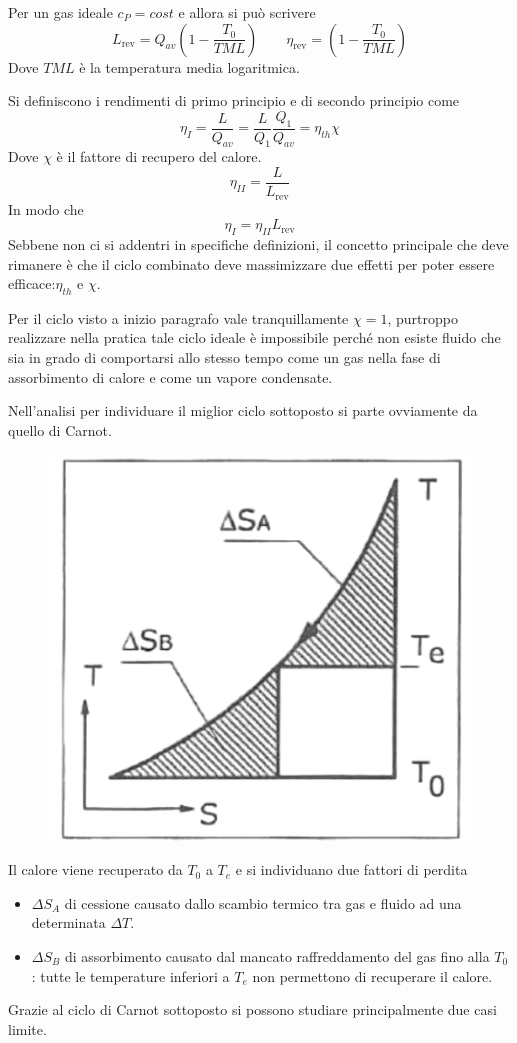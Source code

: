 \begin{adjustwidth}{2in}{}
	Per un gas ideale $c_P=cost$ e allora si può scrivere 
	\[L_\text{rev} = Q_{av}\left(1-\dfrac{T_0}{TML}\right) \qquad \eta_\text{rev} = \left(1-\dfrac{T_0}{TML}\right)\] 
	Dove $TML$ è la temperatura media logaritmica. \newline 
	
	Si definiscono i rendimenti di primo principio e di secondo principio come 
	\[\eta_I = \dfrac{L}{Q_{av}} = \dfrac{L}{Q_1}\dfrac{Q_1}{Q_{av}} = \eta_{th}\chi\]
	Dove $\chi$ è il fattore di recupero del calore.
	\[\eta_{II} = \dfrac{L}{L_\text{rev}} \] 
	In modo che 
	\[\eta_I = \eta_{II}L_\text{rev}\]
	Sebbene non ci si addentri in specifiche definizioni, il concetto principale che deve rimanere è che il ciclo combinato deve massimizzare due effetti per poter essere efficace:$\eta_{th}$ e $\chi$. 
	
	Per il ciclo visto a inizio paragrafo vale tranquillamente $\chi=1$, purtroppo realizzare nella pratica tale ciclo ideale è impossibile perché non esiste fluido che sia in grado di comportarsi allo stesso tempo come un gas nella fase di assorbimento di calore e come un vapore condensate.\newline 
	
	Nell'analisi per individuare il miglior ciclo sottoposto si parte ovviamente da quello di Carnot.
	\begin{figure}[H]
		\centering
		\includegraphics[width=0.5\linewidth]{immagini/impianticombinati3}
		\label{fig:impianticombinati3}
	\end{figure}
	Il calore viene recuperato da $T_0$ a $T_e$ e si individuano due fattori di perdita
	\begin{itemize}
		\item $\Delta S_A$ di cessione causato dallo scambio termico tra gas e fluido ad una determinata $\Delta T$.
		\item $\Delta S_B$ di assorbimento causato dal mancato raffreddamento del gas fino alla $T_0$: tutte le temperature inferiori a $T_e$ non permettono di recuperare il calore.
	\end{itemize}
	Grazie al ciclo di Carnot sottoposto si possono studiare principalmente due casi limite. \newline 
	

\end{adjustwidth}
